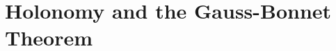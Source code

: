 \documentclass[Shifrin_Solutions_Spring_2018]{subfiles}
\begin{document}
\section{Holonomy and the Gauss-Bonnet Theorem}

\begin{exercise}

\end{exercise}

\begin{exercise}

\end{exercise}

\begin{exercise}

\end{exercise}


\begin{exercise}

\end{exercise}


\begin{exercise}

\end{exercise}


\begin{exercise}

\end{exercise}


\begin{exercise}

\end{exercise}


\begin{exercise}

\end{exercise}


\begin{exercise}

\end{exercise}


\begin{exercise}

\end{exercise}


\begin{exercise}

\end{exercise}


\begin{exercise}

\end{exercise}


\begin{exercise}

\end{exercise}


\begin{exercise}

\end{exercise}


\begin{exercise}

\end{exercise}


\begin{exercise}

\end{exercise}
\end{document}

